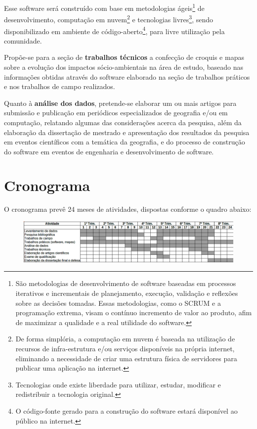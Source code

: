 Esse software será construído com base em metodologias ágeis\footnote{São metodologias de desenvolvimento de software baseadas em processos iterativos e incrementais de planejamento, execução, validação e reflexões sobre as decisões tomadas. Essas metodologias, como o SCRUM e a programação extrema, visam o contínuo incremento de valor ao produto, afim de maximizar a qualidade e a real utilidade do software.} de desenvolvimento, computação em nuvem\footnote{De forma simplória, a computação em nuvem é baseada na utilização de recursos de infra-estrutura e/ou serviços disponíveis na própria internet, eliminando a necessidade de criar uma estrutura física de servidores para publicar uma aplicação na internet.} e tecnologias livres\footnote{Tecnologias onde existe liberdade para utilizar, estudar, modificar e redistribuir a tecnologia original.}, sendo disponibilizado em ambiente de código-aberto\footnote{O código-fonte gerado para a construção do software estará disponível ao público na internet.}, para livre utilização pela comunidade.

Propõe-se para a seção de \textbf{trabalhos técnicos} a confecção de croquis e mapas sobre a evolução dos impactos sócio-ambientais na área de estudo, baseado nas informações obtidas através do software elaborado na seção de trabalhos práticos e nos trabalhos de campo realizados.

Quanto à \textbf{análise dos dados}, pretende-se elaborar um ou mais artigos para submissão e publicação em periódicos especializados de geografia e/ou em computação, relatando algumas das considerações acerca da pesquisa, além da elaboração da dissertação de mestrado e apresentação dos resultados da pesquisa em eventos científicos com a temática da geografia, e do processo de construção do software em eventos de engenharia e desenvolvimento de software.

\section{Cronograma}

O cronograma prevê 24 meses de atividades, dispostas conforme o quadro abaixo:

\begin{figure}[htb]
\begin{center}
    \includegraphics[scale=0.4]{crono.png}
\end{center}
\end{figure}

